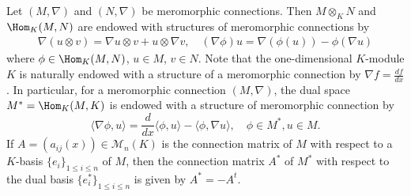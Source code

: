 Let $(M,\nabla)$ and $(N,\nabla)$ be meromorphic connections. Then $M\otimes_KN$ and $\Hom_K(M,N)$ are endowed with structures of meromorphic connections by
\begin{align*}
\nabla(u\otimes v)=\nabla u\otimes v+u\otimes\nabla v,\quad (\nabla\phi)u=\nabla(\phi(u))-\phi(\nabla u)
\end{align*}
where $\phi\in\Hom_K(M,N)$, $u\in M$, $v\in N$. Note that the one-dimensional $K$-module $K$ is naturally endowed with a structure of a meromorphic connection by $\nabla f=\frac{df}{dx}$. In particular, for a meromorphic connection $(M,\nabla)$, the dual space $M^*=\Hom_K(M,K)$ is endowed with a structure of meromorphic connection by
\[\langle\nabla\phi,u\rangle=\frac{d}{dx}\langle\phi,u\rangle-\langle\phi,\nabla u\rangle,\quad \phi\in M^*,u\in M.\]
If $A=(a_{ij}(x))\in\mathcal{M}_n(K)$ is the connection matrix of $M$ with respect to a $K$-basis $\{e_i\}_{1\leq i\leq n}$ of $M$, then the connection matrix $A^*$ of $M^*$ with respect to the dual basis $\{e_i^*\}_{1\leq i\leq n}$ is given by $A^*=-A^t$.

